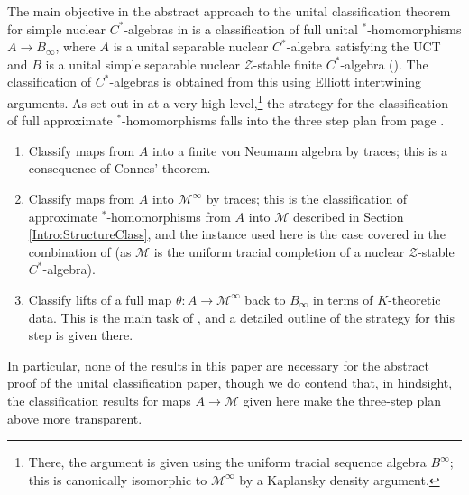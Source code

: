 \documentclass[a4paper,11pt]{amsart}
\theoremstyle{definition}
\numberwithin{equation}{section}
\numberwithin{theorem}{section}
\newcommand{\Z}{\mathcal Z}
\newcommand{\M}{\mathcal{M}}
\begin{document}
The main objective in the abstract approach to the unital classification theorem for simple nuclear $C^*$-algebras in \cite{CGSTW} is a classification of full unital $^*$-homomorphisms $A\to B_\infty$, where $A$ is a unital separable nuclear $C^*$-algebra satisfying the UCT and $B$ is a unital simple separable nuclear $\Z$-stable finite $C^*$-algebra (\cite[Theorem 1.1]{CGSTW}). The classification of $C^*$-algebras is obtained from this using Elliott intertwining arguments.  As set out in \cite[Section 1.3]{CGSTW} at a very high level,\footnote{There, the argument is given using the uniform tracial sequence algebra $B^\infty$; this is canonically isomorphic to $\M^\infty$ by a Kaplansky density argument.} the strategy for the classification of full approximate $^*$-homomorphisms falls into the three step plan from page \pageref{item:intro:overallplan3}.
\begin{enumerate}
\item Classify maps from $A$ into a finite von Neumann algebra by traces; this is a consequence of Connes' theorem.
\item Classify maps from $A$ into $\mathcal M^\infty$ by traces; this is the classification of approximate $^*$-homomorphisms from $A$ into $\M$ described in Section \ref{Intro:StructureClass}, and the instance used here is the case covered in the combination of \cite{CETWW,CETW-classification} (as $\M$ is the uniform tracial completion of a nuclear $\Z$-stable $C^*$-algebra).
\item Classify lifts of a full map $\theta\colon A\to \M^\infty$ back to $B_\infty$ in terms of $K$-theoretic data. This is the main task of \cite{CGSTW}, and a detailed outline of the strategy for this step is given there.
\end{enumerate}
In particular, none of the results in this paper are necessary for the abstract proof of the unital classification paper, though we do contend that, in hindsight, the classification results for maps $A\to\mathcal M$ given here make the three-step plan above more transparent.
\end{document}
